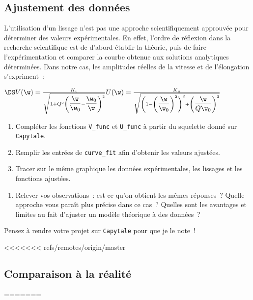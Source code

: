 \documentclass[a4paper, 11pt, final, garamond]{book}
\begin{document}
\subsection{Ajustement des données}
L'utilisation d'un lissage n'est pas une approche scientifiquement approuvée
pour déterminer des valeurs expérimentales. En effet, l'ordre de réflexion dans
la recherche scientifique est de d'abord établir la théorie, puis de faire
l'expérimentation et comparer la courbe obtenue aux solutions analytiques
déterminées. Dans notre cas, les amplitudes réelles de la vitesse et de
l'élongation s'expriment~:
\begin{center}
    $\DS
    \hfill
    V(\w)
        = \frac{K_v}{\sqrt{1 + Q^2\left( \dfrac{\w}{\w_0} - \dfrac{\w_0}{\w}
        \right)^2}}
    \hfill
    U(\w)
        = \frac{K_u}{
            \sqrt{\left( 1 - \left(\dfrac{\w}{\w_0}\right)^2 \right)^2
        + \left(\dfrac{\w}{Q\w_0}\right)^2}}
    \hfill
    $
\end{center}
\begin{enumerate}
    \item Compléter les fonctions \texttt{V\_func} et \texttt{U\_func} à partir
        du squelette donné sur \texttt{Capytale}.
    \item Remplir les entrées de \texttt{curve\_fit} afin d'obtenir les valeurs
        ajustées.
    \item Tracer sur le même graphique les données expérimentales, les lissages et
        les fonctions ajustées.
\end{enumerate} \bigbreak
\begin{enumerate}[label=\sqenumi, start=13]
    \item Relever vos observations~: est-ce qu'on obtient les mêmes réponses~?
        Quelle approche vous paraît plus précise dans ce cas~? Quelles sont les
        avantages et limites au fait d'ajuster un modèle théorique à des
        données~?
\end{enumerate}

\begin{center}
    \begin{framed}
        \Large Pensez à rendre votre projet sur \texttt{Capytale} pour que je le
        note~!
    \end{framed}
\end{center}

<<<<<<< refs/remotes/origin/master
\subsection{Comparaison à la réalité} 
=======
\end{document}
